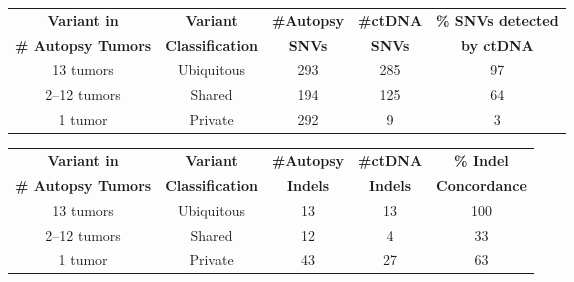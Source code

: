 \begin{figure}[p]
    \centering
    \begin{subfigure}{\textwidth}
        \begin{tabular}{ccccc}
            \textbf{Variant in} & \textbf{Variant} & \textbf{\#Autopsy} & \textbf{\#ctDNA} & \textbf{\% SNVs detected} \\
            \textbf{\# Autopsy Tumors} & \textbf{Classification} & \textbf{SNVs} & \textbf{SNVs} & \textbf{by ctDNA} \\
            \hline
            13 tumors & Ubiquitous & 293 & 285 & 97 \\
            2--12 tumors & Shared & 194 & 125 & 64 \\
            1 tumor & Private & 292 & 9 & 3
        \end{tabular}
        \caption{}\label{fig:sclc:tissue_ctdna_snv_table}
    \end{subfigure}
    
    \vspace{0.5cm}
    \begin{subfigure}{\textwidth}
        \begin{tabular}{ccccc}
            \textbf{Variant in} & \textbf{Variant} & \textbf{\#Autopsy} & \textbf{\#ctDNA} & \textbf{\% Indel} \\
            \textbf{\# Autopsy Tumors} & \textbf{Classification} & \textbf{Indels} & \textbf{Indels} & \textbf{Concordance} \\
            \hline
            13 tumors & Ubiquitous & 13 & 13 & 100 \\
            2--12 tumors & Shared & 12 & 4 & 33 \\
            1 tumor & Private & 43 & 27 & 63
        \end{tabular}
        \caption{}\label{fig:sclc:tissue_ctdna_indel_table}
    \end{subfigure}
    

\end{figure}
